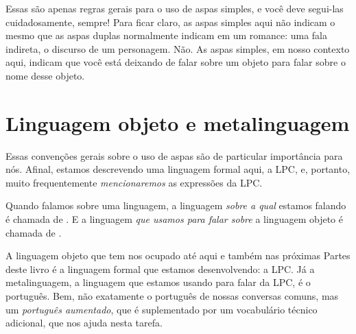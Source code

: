 Essas são apenas regras gerais para o uso de aspas simples, e você deve segui-las cuidadosamente, sempre!
Para ficar claro, as aspas simples aqui não indicam o mesmo que as aspas duplas normalmente indicam em um romance:
uma fala indireta, o discurso de um personagem.
Não.
As aspas simples, em nosso contexto aqui, indicam que você está deixando de falar sobre um objeto para falar sobre o nome desse objeto.


\section{Linguagem objeto e metalinguagem}\label{s:LingObjMeta}
Essas convenções gerais sobre o uso de aspas são de particular importância para nós.
Afinal, estamos descrevendo uma linguagem formal aqui, a LPC, e, portanto, muito frequentemente \emph{mencionaremos} as expressões da LPC.

Quando falamos sobre uma linguagem, a linguagem \emph{sobre a qual} estamos falando é chamada de .
E a linguagem \emph{que usamos para falar sobre} a linguagem objeto é chamada de .
\label{def.metalanguage}

A linguagem objeto que tem nos ocupado até aqui e também nas próximas Partes deste livro é a linguagem formal que estamos desenvolvendo: a LPC.
Já a metalinguagem, a linguagem que estamos usando para falar da LPC, é o português.
Bem, não exatamente o português de nossas conversas comuns, mas um \emph{português aumentado}, que é suplementado por um vocabulário técnico adicional, que nos ajuda nesta tarefa.

